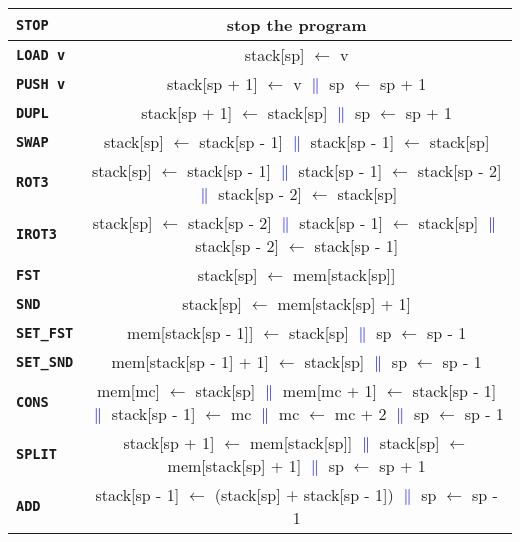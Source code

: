 \documentclass[12pt]{article}
\begin{document}
\thispagestyle{empty}

\begin{landscape}

\begin{center}
\begin{tabular}{|l||c|}
\hline
\textbf{\texttt{STOP}} & stop the program\\
\hline 
\textbf{\texttt{LOAD v}} & stack[sp] $\leftarrow$ v\\
\hline
\textbf{\texttt{PUSH v}} & stack[sp + 1] $\leftarrow$ v \textcolor{blue}{$\|$} sp $\leftarrow$ sp + 1\\
\hline
\textbf{\texttt{DUPL}} & stack[sp + 1] $\leftarrow$ stack[sp] \textcolor{blue}{$\|$} sp $\leftarrow$ sp + 1\\
\hline
\textbf{\texttt{SWAP}} & stack[sp] $\leftarrow$ stack[sp - 1] \textcolor{blue}{$\|$} stack[sp - 1] $\leftarrow$ stack[sp]\\
\hline
\textbf{\texttt{ROT3}} & stack[sp] $\leftarrow$ stack[sp - 1] \textcolor{blue}{$\|$} stack[sp - 1] $\leftarrow$ stack[sp - 2] \textcolor{blue}{$\|$} stack[sp - 2] $\leftarrow$ stack[sp]\\
\hline
\textbf{\texttt{IROT3}} & stack[sp] $\leftarrow$ stack[sp - 2] \textcolor{blue}{$\|$} stack[sp - 1] $\leftarrow$ stack[sp] \textcolor{blue}{$\|$} stack[sp - 2] $\leftarrow$ stack[sp - 1]\\
\hline
\textbf{\texttt{FST}} & stack[sp] $\leftarrow$ mem[stack[sp]]\\
\hline
\textbf{\texttt{SND}} & stack[sp] $\leftarrow$ mem[stack[sp] + 1]\\
\hline
\textbf{\texttt{SET\_FST}} & mem[stack[sp - 1]] $\leftarrow$ stack[sp] \textcolor{blue}{$\|$} sp $\leftarrow$ sp - 1\\
\hline
\textbf{\texttt{SET\_SND}} & mem[stack[sp - 1] + 1] $\leftarrow$ stack[sp] \textcolor{blue}{$\|$} sp $\leftarrow$ sp - 1\\
\hline
\textbf{\texttt{CONS}} & mem[mc] $\leftarrow$ stack[sp] \textcolor{blue}{$\|$} mem[mc + 1] $\leftarrow$ stack[sp - 1] \textcolor{blue}{$\|$} stack[sp - 1] $\leftarrow$ mc \textcolor{blue}{$\|$} mc $\leftarrow$ mc + 2 \textcolor{blue}{$\|$} sp $\leftarrow$ sp - 1\\
\hline
\textbf{\texttt{SPLIT}} & stack[sp + 1] $\leftarrow$ mem[stack[sp]] \textcolor{blue}{$\|$} stack[sp] $\leftarrow$ mem[stack[sp] + 1] \textcolor{blue}{$\|$} sp $\leftarrow$ sp + 1\\
\hline
\textbf{\texttt{ADD}} & stack[sp - 1] $\leftarrow$ (stack[sp] $+$ stack[sp - 1]) \textcolor{blue}{$\|$} sp $\leftarrow$ sp - 1\\

\end{tabular}
\end{center}
\end{landscape}
\end{document}
